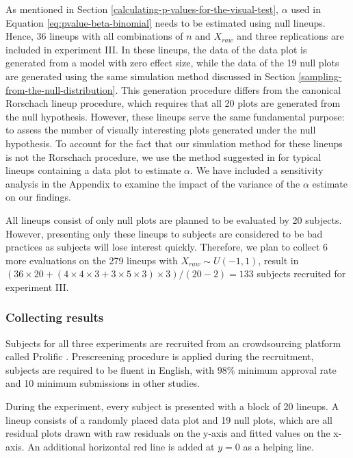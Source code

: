 \documentclass[]{interact}
\theoremstyle{plain}%
\theoremstyle{definition}
\theoremstyle{remark}
\begin{document}
As mentioned in Section \ref{calculating-p-values-for-the-visual-test},
\(\alpha\) used in Equation \ref{eq:pvalue-beta-binomial} needs to be
estimated using {\textcolor{orange-red}{null}} lineups. Hence, 36
lineups with all combinations of \(n\) and \(X_{raw}\) and three
replications are included in experiment III. In these lineups, the data
of the data plot is generated from a model
{\textcolor{orange-red}{with zero effect size}}, while the data of the
19 null plots are generated using the same simulation method discussed
in Section \ref{sampling-from-the-null-distribution}.
{\textcolor{orange-red}{This generation procedure differs from the canonical Rorschach lineup procedure, which requires that all 20 plots are generated from the null hypothesis. However, these lineups serve the same fundamental purpose: to assess the number of visually interesting plots generated under the null hypothesis.}}
{\textcolor{orange-red}{To account for the fact that our simulation method for these lineups is not the Rorschach procedure,}}
we use the method suggested in \citet{vanderplas2021statistical} for
typical lineups containing a data plot to estimate \(\alpha\). We have
included a sensitivity analysis in the Appendix to examine the impact of
the variance of the \(\alpha\) estimate on our findings.

All lineups consist of only null plots are planned to be evaluated by 20
subjects. However, presenting only these lineups to subjects are
considered to be bad practices as subjects will lose interest quickly.
Therefore, we plan to collect 6 more evaluations on the 279 lineups with
\(X_{raw} \sim U(-1,1)\), result in
\((36 \times 20 + (4 \times 4 \times 3 + 3 \times 5 \times 3) \times 3) / (20-2) = 133\)
subjects recruited for experiment III.

\hypertarget{collecting-results}{%
\subsubsection{Collecting results}\label{collecting-results}}

Subjects for all three experiments are recruited from an crowdsourcing
platform called Prolific \citep{palan2018prolific}. Prescreening
procedure is applied during the recruitment, subjects are required to be
fluent in English, with \(98\%\) minimum approval rate and 10 minimum
submissions in other studies.

During the experiment, every subject is presented with a block of 20
lineups. A lineup consists of a randomly placed data plot and 19 null
plots, which are all residual plots drawn with raw residuals on the
y-axis and fitted values on the x-axis. An additional horizontal red
line is added at \(y = 0\) as a helping line.
\end{document}
